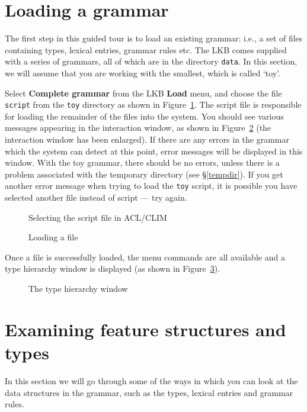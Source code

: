 \documentclass[12pt]{report}
\begin{document}
\section{Loading a grammar}
\label{gramload}

The first step in this guided tour is to load an existing grammar: i.e.,
a set of files containing types, lexical entries, grammar rules etc.  
The LKB comes supplied with a series of grammars,
all of which are in the directory \verb+data+.  In this section, we
will assume that you are working with the smallest, which is called
`toy'.  

Select {\bf Complete grammar} from the LKB {\bf Load}
menu, and choose the file {\tt script} from the {\tt toy} directory
as shown in Figure~\ref{loadscript}.  The script file is responsible for
loading the remainder of the files into the system.  You should see various
messages appearing in the interaction window, as shown in
Figure~\ref{loadmess}
(the interaction window has been enlarged).  
If there are any errors in the grammar which the system
can detect at this point, error messages will be displayed in this window.
With the toy grammar, there should be no errors, unless there is a problem 
associated with the temporary directory (see \S\ref{tempdir}).
If
you get another error message when trying to load the {\tt toy} script, it is
possible you have selected another file instead of script --- try again.
\begin{figure}
\epsfxsize=3in
\caption{Selecting the script file in ACL/CLIM}
\label{loadscript}
\end{figure}
\begin{figure}
\caption{Loading a file}
\label{loadmess}
\end{figure}

Once a file is successfully loaded, the menu commands are all available
and a type hierarchy window is displayed (as shown in Figure~\ref{typehier}).
\begin{figure}
\epsfxsize=3in
\caption{The type hierarchy window}
\label{typehier}
\end{figure}


\section{Examining feature structures and types}

In this section we will go through some of the ways in which
you can look at the data structures in the grammar, such as the types,
lexical entries and grammar rules.
\end{document}
